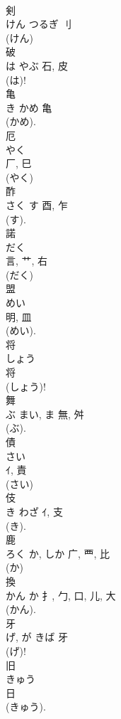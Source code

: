 \documentclass[8pt]{extreport}
\begin{document}
\begin{CJK}{UTF8}{min}
\\	剣	
\\	けん	つるぎ	刂		
\\	(けん) 
\\	破	
\\	は	やぶ	石, 皮	
\\	(は)!
\\	亀	
\\	き	かめ	亀	
\\	(かめ). 
\\	厄	
\\	やく	
\\	厂, 巳	
\\	(やく) 
\\	酢	
\\	さく	す	酉, 乍	
\\	(す). 
\\	諾	
\\	だく	
\\	言, 艹, 右	
\\	(だく) 
\\	盟	
\\	めい	
\\	明, 皿	
\\	(めい). 
\\	将	
\\	しょう	
\\	将	
\\	(しょう)! 
\\	舞	
\\	ぶ	まい, ま	無, 舛	
\\	(ぶ). 
\\	債	
\\	さい	
\\	ｲ, 責	
\\	(さい) 
\\	伎	
\\	き	わざ	ｲ, 支	
\\	(き). 
\\	鹿	
\\	ろく	か, しか	广, 覀, 比	
\\	(か) 
\\	換	
\\	かん	か	扌, 勹, 口, 儿, 大	
\\	(かん). 
\\	牙	
\\	げ, が	きば	牙	
\\	(げ)! 
\\	旧	
\\	きゅう	
\\	日		
\\	(きゅう).	

\end{CJK}
\end{document}
